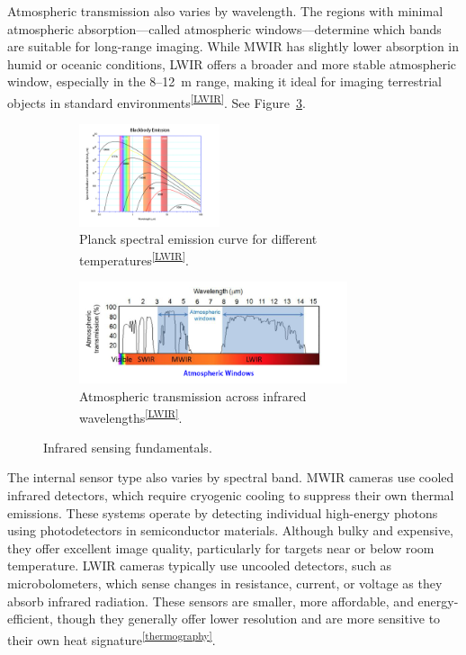 Atmospheric transmission also varies by wavelength. The regions with minimal atmospheric absorption—called atmospheric windows—determine which bands are suitable for long-range imaging. While MWIR has slightly lower absorption in humid or oceanic conditions, LWIR offers a broader and more stable atmospheric window, especially in the 8–12~\textmu m range, making it ideal for imaging terrestrial objects in standard environments\textsuperscript{\ref{LWIR}}. See Figure~\ref{fig:atmos_window}.

\begin{figure}[h!]
    \centering
    \begin{subfigure}[b]{0.48\linewidth}
        \centering
        \includegraphics[height=3cm]{figs/Huirui/wien_law_plot.png}
        \caption{Planck spectral emission curve for different temperatures\textsuperscript{\ref{LWIR}}.}
        \label{fig:wien_law}
    \end{subfigure}
    \hfill
    \begin{subfigure}[b]{0.48\linewidth}
        \centering
        \includegraphics[height=3cm]{figs/Huirui/atmospheric_window_plot.png}
        \caption{Atmospheric transmission across infrared wavelengths\textsuperscript{\ref{LWIR}}.}
        \label{fig:atmos_window}
    \end{subfigure}
    \caption{Infrared sensing fundamentals.}
\end{figure}

The internal sensor type also varies by spectral band. MWIR cameras use cooled infrared detectors, which require cryogenic cooling to suppress their own thermal emissions. These systems operate by detecting individual high-energy photons using photodetectors in semiconductor materials. Although bulky and expensive, they offer excellent image quality, particularly for targets near or below room temperature. LWIR cameras typically use uncooled detectors, such as microbolometers, which sense changes in resistance, current, or voltage as they absorb infrared radiation. These sensors are smaller, more affordable, and energy-efficient, though they generally offer lower resolution and are more sensitive to their own heat signature\textsuperscript{\ref{thermography}}.

